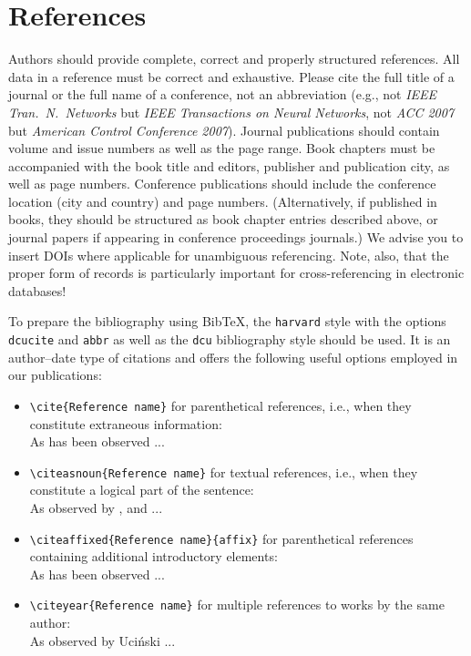 \documentclass{amcs}
\begin{document}
\section{References}
Authors should provide complete, correct and properly structured references. All data in a reference must be correct and exhaustive. Please cite the full title of a journal or the full name of a conference, not an abbreviation (e.g., not \emph{IEEE Tran.~N.~Networks} but \emph{IEEE Transactions on Neural Networks}, not \emph{ACC 2007} but \emph{American Control Conference 2007}). Journal publications should contain volume and issue numbers as well as the page range. Book chapters must be accompanied with the book title and editors, publisher and publication city, as well as page numbers. Conference publications should include the conference location (city and country) and page numbers. (Alternatively, if published in books, they should be structured as book chapter entries described above, or journal papers if appearing in conference proceedings journals.) We advise you to insert DOIs where applicable for unambiguous referencing. Note, also, that the proper form of records is particularly important for cross-referencing in electronic databases!

To prepare the bibliography using Bib\TeX, the \verb+harvard+ style with the options \verb+dcucite+ and \verb+abbr+ as well as the \verb+dcu+ bibliography style should be used. It is an author--date type of citations and offers the following useful options employed in our publications:
\begin{itemize}
  \item \verb+\cite{Reference name}+ for parenthetical references, i.e., when they constitute extraneous information:\\[+1ex]
        As has been observed \cite{Haykin:99,Reinelt:02,Maryak:2001} ...
  \item \verb+\citeasnoun{Reference name}+ for textual references, i.e., when they constitute a logical part of the sentence:\\[+1ex]
        As observed by ,  and  ...
  \item \verb+\citeaffixed{Reference name}{affix}+ for parenthetical references containing additional introductory elements:\\[+1ex]
        As has been observed  ...
  \item \verb+\citeyear{Reference name}+ for multiple references to works by the same author:\\[+1ex]
        As observed by Uci\'nski \citeyear{Ucinski:99,Ucinski:05a,Ucinski:05b} ...
\end{itemize}
\end{document}
